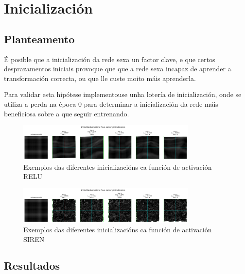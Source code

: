 \section{Inicialización}
\label{sec:Inicialización}

\subsection{Planteamento}
\label{subsec:Planteamento-initialization}

É posible que a inicialización da rede sexa un factor clave, e que certos desprazamentos iniciais provoque que que a rede sexa incapaz de aprender a transformación correcta, ou que lle custe moito máis aprenderla.

Para validar esta hipótese implementouse unha lotería de inicialización, onde se utiliza a perda na época 0 para determinar a inicialización da rede máis beneficiosa sobre a que seguir entrenando.


\begin{figure}[tbp]
    \centering
    \includegraphics[width=0.8\textwidth]{imaxes/lottery/initial_deformations_combinedMLP.png}
    \caption{Exemplos das diferentes inicializacións ca función de activación RELU}
    \label{fig:lottery_initial_deformations_combinedMLP}
\end{figure}

\begin{figure}[tbp]
    \centering
    \includegraphics[width=0.8\textwidth]{imaxes/lottery/initial_deformations_combinedSIREN.png}
    \caption{Exemplos das diferentes inicializacións ca función de activación SIREN}
    \label{fig:lottery_initial_deformations_combinedSIREN}
\end{figure}


\subsection{Resultados}
\label{subsec:Resultados-initialization}


